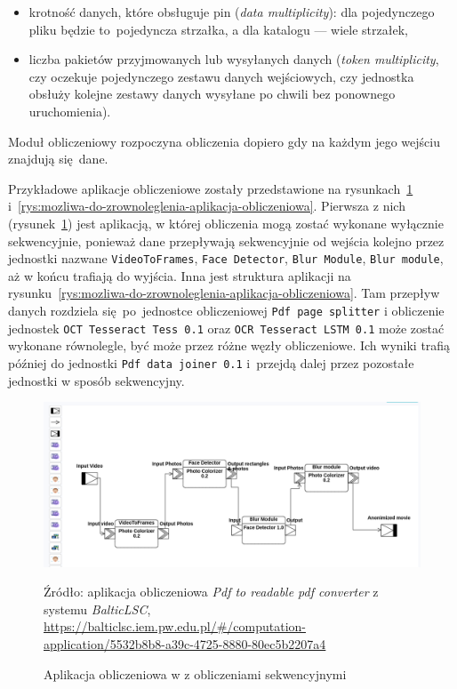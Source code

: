 \begin{itemize}
	\item krotność danych, które obsługuje pin (\emph{data
		      multiplicity}):  dla pojedynczego pliku będzie to~pojedyncza strzałka, a dla katalogu --- wiele strzałek,
	\item liczba pakietów przyjmowanych lub wysyłanych danych (\emph{token
		      multiplicity}, czy oczekuje pojedynczego zestawu danych wejściowych, czy jednostka obsłuży kolejne zestawy danych wysyłane po chwili bez ponownego uruchomienia).
\end{itemize}

Moduł obliczeniowy rozpoczyna obliczenia dopiero gdy na każdym jego wejściu
znajdują się dane.

Przykładowe aplikacje obliczeniowe zostały przedstawione na
rysunkach~\ref{rys:sekwencyjna-aplikacja-obliczeniowa}
i~\ref{rys:mozliwa-do-zrownoleglenia-aplikacja-obliczeniowa}.
Pierwsza z nich (rysunek~\ref{rys:sekwencyjna-aplikacja-obliczeniowa}) jest
aplikacją, w której obliczenia mogą zostać wykonane
wyłącznie sekwencyjnie, ponieważ dane przepływają sekwencyjnie od wejścia
kolejno przez jednostki nazwane \texttt{VideoToFrames}, \texttt{Face Detector},
\texttt{Blur Module}, \texttt{Blur module}, aż w końcu trafiają do wyjścia.
Inna jest struktura aplikacji na
rysunku~\ref{rys:mozliwa-do-zrownoleglenia-aplikacja-obliczeniowa}. Tam
przepływ danych rozdziela się~po~jednostce obliczeniowej \texttt{Pdf page
	splitter} i obliczenie jednostek \texttt{OCT Tesseract Tess 0.1} oraz
\texttt{OCR Tesseract LSTM 0.1} może zostać wykonane równolegle, być może
przez różne węzły obliczeniowe. Ich wyniki trafią później do jednostki
\texttt{Pdf data joiner 0.1} i~przejdą dalej przez pozostałe jednostki w sposób
sekwencyjny.

\begin{figure}[!ht]
	\centering

	\includegraphics[width=0.95\linewidth]{./images/balticlsc-example-diagram.png}
	\caption{Aplikacja obliczeniowa w \BalticLSC{} z obliczeniami
		sekwencyjnymi}\label{rys:sekwencyjna-aplikacja-obliczeniowa}
	\medskip
	{\small Źródło: aplikacja obliczeniowa \emph{Pdf to readable pdf converter} z
		systemu \emph{BalticLSC},\\
		\url{https://balticlsc.iem.pw.edu.pl/#/computation-application/5532b8b8-a39c-4725-8880-80ec5b2207a4}
  }
\end{figure}

